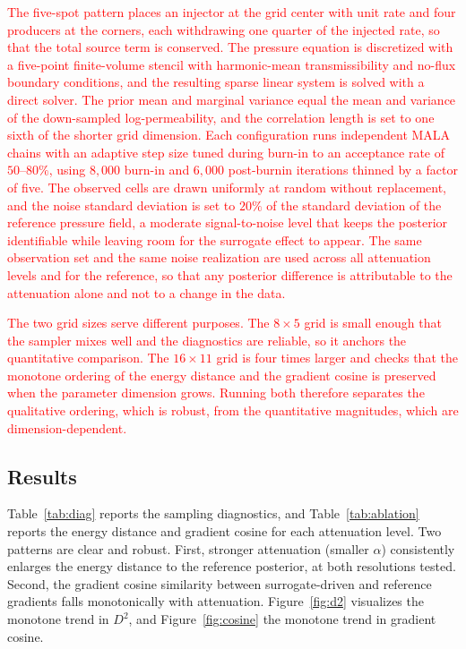 \documentclass[12pt]{article}
\newcommand{\add}[1]{\textcolor{red}{#1}}
\begin{document}
\add{The five-spot pattern places an injector at the grid center with unit rate and four producers at the corners, each withdrawing one quarter of the injected rate, so that the total source term is conserved. The pressure equation is discretized with a five-point finite-volume stencil with harmonic-mean transmissibility and no-flux boundary conditions, and the resulting sparse linear system is solved with a direct solver. The prior mean and marginal variance equal the mean and variance of the down-sampled log-permeability, and the correlation length is set to one sixth of the shorter grid dimension. Each configuration runs independent MALA chains with an adaptive step size tuned during burn-in to an acceptance rate of $50$--$80\%$, using $8{,}000$ burn-in and $6{,}000$ post-burnin iterations thinned by a factor of five. \add{The observed cells are drawn uniformly at random without replacement, and the noise standard deviation is set to $20\%$ of the standard deviation of the reference pressure field, a moderate signal-to-noise level that keeps the posterior identifiable while leaving room for the surrogate effect to appear. The same observation set and the same noise realization are used across all attenuation levels and for the reference, so that any posterior difference is attributable to the attenuation alone and not to a change in the data.}}

\add{The two grid sizes serve different purposes. The $8\times5$ grid is small enough that the sampler mixes well and the diagnostics are reliable, so it anchors the quantitative comparison. The $16\times11$ grid is four times larger and checks that the monotone ordering of the energy distance and the gradient cosine is preserved when the parameter dimension grows. Running both therefore separates the qualitative ordering, which is robust, from the quantitative magnitudes, which are dimension-dependent.}

\subsection{Results}

Table~\ref{tab:diag} reports the sampling diagnostics, and Table~\ref{tab:ablation} reports the energy distance and gradient cosine for each attenuation level. Two patterns are clear and robust. First, stronger attenuation (smaller $\alpha$) consistently enlarges the energy distance to the reference posterior, at both resolutions tested. Second, the gradient cosine similarity between surrogate-driven and reference gradients falls monotonically with attenuation. Figure~\ref{fig:d2} visualizes the monotone trend in $D^{2}$, and Figure~\ref{fig:cosine} the monotone trend in gradient cosine.
\end{document}
